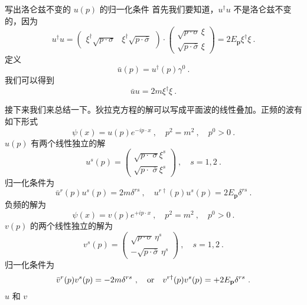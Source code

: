 \begin{exercise}{写出洛仑兹不变的 $u(p)$ 的归一化条件}
首先我们要知道，$u^\dagger u$ 不是洛仑兹不变的，因为\begin{equation}
u^\dagger u = \begin{pmatrix}
\xi^\dagger \sqrt{p\cdot\sigma} & \xi^\dagger \sqrt{p\cdot\bar\sigma}
\end{pmatrix}\cdot \begin{pmatrix}
\sqrt{p\cdot\sigma} \, \xi \\ 
\sqrt{p\cdot \bar\sigma} \, \xi
\end{pmatrix} = 2 E_{\mathbf p} \xi^\dagger \xi~.
\end{equation}
定义
\begin{equation}
\bar u(p) = u^\dagger (p) \gamma^0 ~.
\end{equation}
我们可以得到
\begin{equation}
\bar u u = 2 m \xi^\dagger \xi ~.
\end{equation}
\end{exercise}
接下来我们来总结一下。狄拉克方程的解可以写成平面波的线性叠加。正频的波有如下形式
\begin{equation}
\psi(x) = u(p) e^{-ip\cdot x}~, \quad p^2 = m^2 ~, \quad p^0>0 ~.
\end{equation}
$u(p)$ 有两个线性独立的解
\begin{equation}
u^s(p) = \begin{pmatrix}
\sqrt{p\cdot \,\, \sigma} \xi^s \\
\sqrt{p\cdot \,\, \bar \sigma} \xi^s
\end{pmatrix}~, \quad s = 1,2~.
\end{equation}
归一化条件为
\begin{equation}
\bar u^r (p) u^s (p) = 2 m \delta^{rs} ~, \quad u^{r\dagger} (p) u^s(p) = 2 E_{\mathbf p} \delta^{rs}~.
\end{equation}
负频的解为
\begin{equation}
\psi(x) = v(p) e^{+i p \cdot x} ~, \quad p^2 = m^2 ~, \quad p^0>0~.
\end{equation}
$v(p)$ 的两个线性独立的解为
\begin{equation}
v^s(p)=\begin{pmatrix}
\sqrt{p\cdot\sigma} \, \eta^s\\
-\sqrt{p\cdot\bar\sigma} \, \eta^s 
\end{pmatrix}~,\quad s = 1,2~.
\end{equation}
归一化条件为
\begin{equation}
\bar v^r(p) v^s(p) = -2 m \delta^{rs}~, \quad {\rm or} \quad v^{r\dagger}(p) v^s(p) = + 2 E_{\mathbf p} \delta^{rs}~.
\end{equation}
$u$ 和 $v$




